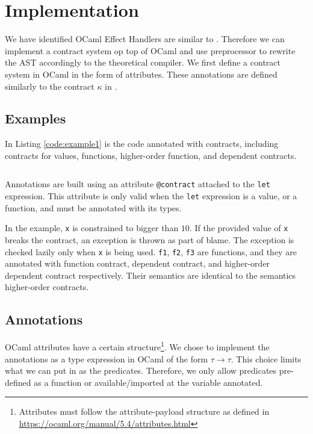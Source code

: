 \chapter{Implementation}
\label{chap:implementation}

We have identified OCaml Effect Handlers are similar to \lange. Therefore we can implement a contract system op top of OCaml and use preprocessor to rewrite the AST accordingly to the theoretical compiler. We first define a contract system in OCaml in the form of attributes. These annotations are defined similarly to the contract $\kappa$ in \langc.

\section{Examples}

In Listing \ref{code:example1} is the code annotated with contracts, including contracts for values, functions, higher-order function, and dependent contracts.

\begin{listing}
\inputminted{ocaml}{code/example1.ml}
\caption{Example contracts annotations in OCaml}
\label{code:example1}
\end{listing}


Annotations are built using an attribute \texttt{@contract} attached to the \texttt{let} expression. This attribute is only valid when the \texttt{let} expression is a value, or a function, and must be annotated with its types.

In the example, \texttt{x} is constrained to bigger than $10$. If the provided value of \texttt{x} breaks the contract, an exception is thrown as part of blame. The exception is checked lazily only when \texttt{x} is being used. \texttt{f1}, \texttt{f2}, \texttt{f3} are functions, and they are annotated with function contract, dependent contract, and higher-order dependent contract respectively. Their semantics are identical to the semantics higher-order contracts.

\section{Annotations}

OCaml attributes have a certain structure\footnote{Attributes must follow the
attribute-payload structure as defined in
\href{https://ocaml.org/manual/5.4/attributes.html}{https://ocaml.org/manual/5.4/attributes.html}}.
We chose to implement the annotations as a type expression in OCaml of the form
$\tau \rightarrow \tau$. This choice limits what we can put in as the
predicates. Therefore, we only allow predicates pre-defined as a function or
available/imported at the variable annotated.

